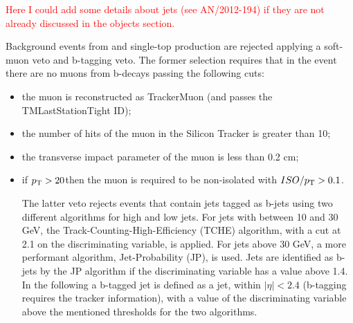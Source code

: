\textcolor{red}{Here I could add some details about jets (see AN/2012-194) if they are not already discussed in the objects section.}

Background events from \ttbar and single-top production are rejected applying a soft-muon veto and b-tagging veto. The former selection requires that in the event there are no muons from b-decays passing the following cuts: 
\begin{itemize}
\item the muon is reconstructed as TrackerMuon (and passes the TMLastStationTight ID);
\item the number of hits of the muon in the Silicon Tracker is greater than 10;
\item the transverse impact parameter of the muon is less than 0.2 cm;
\item if $p_\mathrm{T} > 20$\GeV then the muon is required to be non-isolated with $ISO/p_\mathrm{T} > 0.1$.

The latter veto rejects events that contain jets tagged as b-jets using two different algorithms for high and low \pt jets. For jets with \pt between 10 and 30 GeV, the Track-Counting-High-Efficiency (TCHE) algorithm, with a cut at 2.1 on the discriminating variable, is applied.
For jets above 30 GeV, a more performant algorithm, Jet-Probability (JP), is used. Jets are identified as b-jets by the JP algorithm if the discriminating variable has a value above 1.4.
In the following a b-tagged jet is defined as a jet, within $|\eta|<2.4$ (b-tagging requires the tracker information), with a value of the discriminating variable above the mentioned thresholds for the two algorithms.  



\end{itemize}
